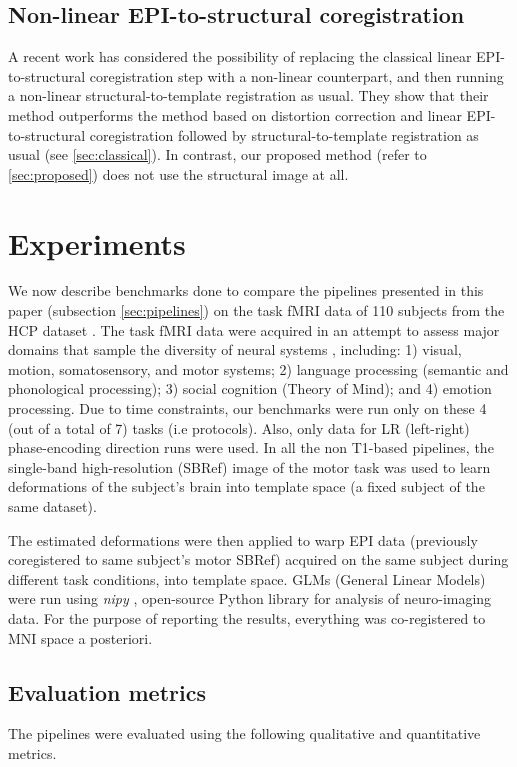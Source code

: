 \subsection{Non-linear EPI-to-structural coregistration}
A recent work \citep{wang2017} has considered the possibility of replacing the classical
linear EPI-to-structural coregistration step with a non-linear counterpart,
and then running a non-linear structural-to-template registration as usual.
They show that their method outperforms the method based on distortion correction
and linear EPI-to-structural coregistration followed by structural-to-template
registration as usual (see \ref{sec:classical}). In contrast, our proposed
method (refer to \ref{sec:proposed}) does not use the structural image at all.


\section{Experiments}
\label{sec:exp}
We now describe benchmarks done to compare the pipelines presented in
this paper (subsection \ref{sec:pipelines}) on the task fMRI data of
110 subjects from the HCP dataset \citep{VanEssen20122222}. 
The task fMRI data were acquired in an attempt to assess major domains
that
sample the diversity of neural systems
, including: 1) visual, motion,
somatosensory, and motor systems; 2) language processing (semantic and
phonological processing); 3) social cognition (Theory of Mind); and 4)
emotion processing.
Due to time constraints, our benchmarks were run only on these 4 (out
of a total of 7) tasks (i.e protocols). Also, only data for LR (left-right)
phase-encoding direction \citep{chang1992technique} runs were used. In all the non T1-based
pipelines, the single-band high-resolution (SBRef) image of the motor
task was used to learn deformations of the subject's brain into
template space (a fixed subject of the same dataset).

The estimated
deformations were then applied to warp EPI data (previously
coregistered to same subject's motor SBRef) acquired on the same
subject during different task conditions, into template space.
GLMs (General Linear Models) \citep{friston1994statistical} were run
using \textit{nipy} \citep{Gorgolewski2011}, open-source Python library for analysis of neuro-imaging data. For the purpose of reporting the results, everything was co-registered to MNI space a posteriori.

\subsection{Evaluation metrics}
The pipelines were evaluated using the following qualitative and quantitative
metrics.

